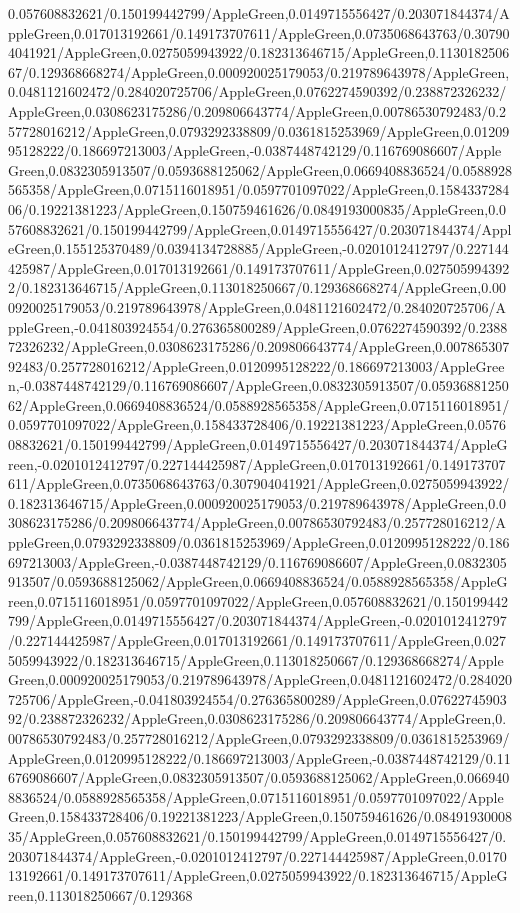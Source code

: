 {\begin{tikzternal}
{0.057608832621/0.150199442799/AppleGreen,0.0149715556427/0.203071844374/AppleGreen,0.017013192661/0.149173707611/AppleGreen,0.0735068643763/0.307904041921/AppleGreen,0.0275059943922/0.182313646715/AppleGreen,0.113018250667/0.129368668274/AppleGreen,0.000920025179053/0.219789643978/AppleGreen,0.0481121602472/0.284020725706/AppleGreen,0.0762274590392/0.238872326232/AppleGreen,0.0308623175286/0.209806643774/AppleGreen,0.00786530792483/0.257728016212/AppleGreen,0.0793292338809/0.0361815253969/AppleGreen,0.0120995128222/0.186697213003/AppleGreen,-0.0387448742129/0.116769086607/AppleGreen,0.0832305913507/0.0593688125062/AppleGreen,0.0669408836524/0.0588928565358/AppleGreen,0.0715116018951/0.0597701097022/AppleGreen,0.158433728406/0.19221381223/AppleGreen,0.150759461626/0.0849193000835/AppleGreen,0.057608832621/0.150199442799/AppleGreen,0.0149715556427/0.203071844374/AppleGreen,0.155125370489/0.0394134728885/AppleGreen,-0.0201012412797/0.227144425987/AppleGreen,0.017013192661/0.149173707611/AppleGreen,0.0275059943922/0.182313646715/AppleGreen,0.113018250667/0.129368668274/AppleGreen,0.000920025179053/0.219789643978/AppleGreen,0.0481121602472/0.284020725706/AppleGreen,-0.041803924554/0.276365800289/AppleGreen,0.0762274590392/0.238872326232/AppleGreen,0.0308623175286/0.209806643774/AppleGreen,0.00786530792483/0.257728016212/AppleGreen,0.0120995128222/0.186697213003/AppleGreen,-0.0387448742129/0.116769086607/AppleGreen,0.0832305913507/0.0593688125062/AppleGreen,0.0669408836524/0.0588928565358/AppleGreen,0.0715116018951/0.0597701097022/AppleGreen,0.158433728406/0.19221381223/AppleGreen,0.057608832621/0.150199442799/AppleGreen,0.0149715556427/0.203071844374/AppleGreen,-0.0201012412797/0.227144425987/AppleGreen,0.017013192661/0.149173707611/AppleGreen,0.0735068643763/0.307904041921/AppleGreen,0.0275059943922/0.182313646715/AppleGreen,0.000920025179053/0.219789643978/AppleGreen,0.0308623175286/0.209806643774/AppleGreen,0.00786530792483/0.257728016212/AppleGreen,0.0793292338809/0.0361815253969/AppleGreen,0.0120995128222/0.186697213003/AppleGreen,-0.0387448742129/0.116769086607/AppleGreen,0.0832305913507/0.0593688125062/AppleGreen,0.0669408836524/0.0588928565358/AppleGreen,0.0715116018951/0.0597701097022/AppleGreen,0.057608832621/0.150199442799/AppleGreen,0.0149715556427/0.203071844374/AppleGreen,-0.0201012412797/0.227144425987/AppleGreen,0.017013192661/0.149173707611/AppleGreen,0.0275059943922/0.182313646715/AppleGreen,0.113018250667/0.129368668274/AppleGreen,0.000920025179053/0.219789643978/AppleGreen,0.0481121602472/0.284020725706/AppleGreen,-0.041803924554/0.276365800289/AppleGreen,0.0762274590392/0.238872326232/AppleGreen,0.0308623175286/0.209806643774/AppleGreen,0.00786530792483/0.257728016212/AppleGreen,0.0793292338809/0.0361815253969/AppleGreen,0.0120995128222/0.186697213003/AppleGreen,-0.0387448742129/0.116769086607/AppleGreen,0.0832305913507/0.0593688125062/AppleGreen,0.0669408836524/0.0588928565358/AppleGreen,0.0715116018951/0.0597701097022/AppleGreen,0.158433728406/0.19221381223/AppleGreen,0.150759461626/0.0849193000835/AppleGreen,0.057608832621/0.150199442799/AppleGreen,0.0149715556427/0.203071844374/AppleGreen,-0.0201012412797/0.227144425987/AppleGreen,0.017013192661/0.149173707611/AppleGreen,0.0275059943922/0.182313646715/AppleGreen,0.113018250667/0.129368}
\end{tikzternal}}
